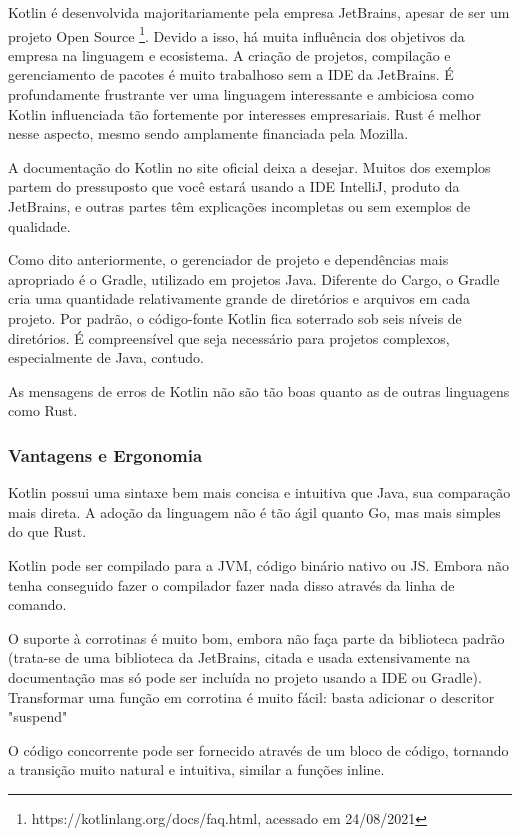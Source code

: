 \documentclass{article}
\begin{document}
Kotlin é desenvolvida majoritariamente pela empresa JetBrains, apesar de ser um projeto Open Source \footnote{https://kotlinlang.org/docs/faq.html, acessado em 24/08/2021}. Devido a isso, há muita influência dos objetivos da empresa na linguagem e ecosistema. A criação de projetos, compilação e gerenciamento de pacotes é muito trabalhoso sem a IDE da JetBrains. É profundamente frustrante ver uma linguagem interessante e ambiciosa como Kotlin influenciada tão fortemente por interesses empresariais. Rust é melhor nesse aspecto, mesmo sendo amplamente financiada pela Mozilla.

A documentação do Kotlin no site oficial deixa a desejar. Muitos dos exemplos partem do pressuposto que você estará usando a IDE IntelliJ, produto da JetBrains, e outras partes têm explicações incompletas ou sem exemplos de qualidade.

Como dito anteriormente, o gerenciador de projeto e dependências mais apropriado é o Gradle, utilizado em projetos Java. Diferente do Cargo, o Gradle cria uma quantidade relativamente grande de diretórios e arquivos em cada projeto. Por padrão, o código-fonte Kotlin fica soterrado sob seis níveis de diretórios. É compreensível que seja necessário para projetos complexos, especialmente de Java, contudo.

As mensagens de erros de Kotlin não são tão boas quanto as de outras linguagens como Rust.

\subsubsection{Vantagens e Ergonomia}
\label{sssec:kotlin vantagens}

Kotlin possui uma sintaxe bem mais concisa e intuitiva que Java, sua comparação mais direta. A adoção da linguagem não é tão ágil quanto Go, mas mais simples do que Rust.

Kotlin pode ser compilado para a JVM, código binário nativo ou JS. Embora não tenha conseguido fazer o compilador fazer nada disso através da linha de comando.

O suporte à corrotinas é muito bom, embora não faça parte da biblioteca padrão (trata-se de uma biblioteca da JetBrains, citada e usada extensivamente na documentação mas só pode ser incluída no projeto usando a IDE ou Gradle). Transformar uma função em corrotina é muito fácil: basta adicionar o descritor "suspend"

O código concorrente pode ser fornecido através de um bloco de código, tornando a transição muito natural e intuitiva, similar a funções inline.
\end{document}
